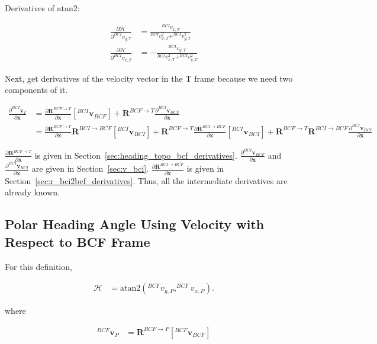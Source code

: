 \documentclass[]{article}
\newcommand{\vb}[1]{\bm{#1}} %
\newcommand{\pd}[2]{\frac{\partial #1}{\partial #2}} %
\begin{document}
Derivatives of $\mathrm{atan2}$:

\begin{align}
\pd{\mathcal{H}}{^{BCI} {v}_{y, T}} &= \frac{^{BCI} v_{x, T}}{^{BCI} v_{x, T}^2 + ^{BCI} v_{y, T}^2} \\
\pd{\mathcal{H}}{^{BCI} {v}_{x, T}} &= - \frac{^{BCI} v_{y, T}}{^{BCI} v_{x, T}^2 + ^{BCI} v_{y, T}^2}
\end{align}

Next, get derivatives of the velocity vector in the T frame because we need two components of it.

\begin{align}
\label{eq:v_topo_wrt_bci_derivative}
\pd{^{BCI} \vb{v}_T}{\vb{x}} &= \pd{\vb{R}^{BCF \rightarrow T}}{\vb{x}} \left[ ^{BCI} \vb{v}_{BCF} \right] + \vb{R}^{BCF \rightarrow T} \pd{^{BCI} \vb{v}_{BCF}}{\vb{x}} \\
&= \pd{\vb{R}^{BCF \rightarrow T}}{\vb{x}} \vb{R}^{BCI \rightarrow BCF} \left[ ^{BCI} \vb{v}_{BCI} \right] + \vb{R}^{BCF \rightarrow T} \pd{\vb{R}^{BCI \rightarrow BCF}}{\vb{x}} \left[ ^{BCI} \vb{v}_{BCI} \right] + \vb{R}^{BCF \rightarrow T} \vb{R}^{BCI \rightarrow BCF} \pd{^{BCI} \vb{v}_{BCI}}{\vb{x}}
\end{align}

\noindent $\pd{\vb{R}^{BCF \rightarrow T}}{\vb{x}}$ is given in Section~\ref{sec:heading_topo_bcf_derivatives}. $\pd{^{BCI} \vb{v}_{BCF}}{\vb{x}}$ and $\pd{^{BCI} \vb{v}_{BCI}}{\vb{x}}$ are given in Section~\ref{sec:v_bci}. $\pd{\vb{R}^{BCI \rightarrow BCF}}{\vb{x}}$ is given in Section~\ref{sec:r_bci2bcf_derivatives}. Thus, all the intermediate derivatives are already known.

\subsection{Polar Heading Angle Using Velocity with Respect to BCF Frame}

For this definition,

\begin{align}
\mathcal{H} &= \mathrm{atan2} \left( ^{BCF} {v}_{y, P}, ^{BCF} {v}_{x, P} \right).
\end{align}

\noindent where

\begin{align}
	^{BCF} \vb{v}_P &= \vb{R}^{BCF \rightarrow P} \left[ ^{BCF} \vb{v}_{BCF} \right]
\end{align}
\end{document}
